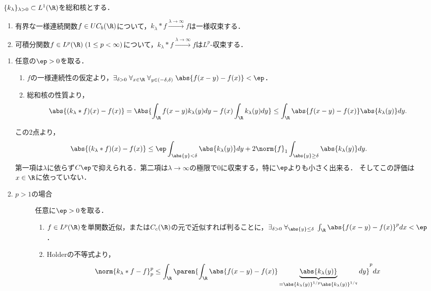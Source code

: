 \documentclass[uplatex,dvipdfmx]{jsreport}
\begin{document}
\begin{theorem}\label{thm-property-of-summerbility-kernel-in-R}
    $\{k_\lambda\}_{\lambda>0}\subset L^1(\R)$を総和核とする．
    \begin{enumerate}
        \item 有界な一様連続関数$f\in UC_b(\R)$について，$k_\lambda*f\xrightarrow{\lambda\to\infty}f$は一様収束する．
        \item 可積分関数$f\in L^p(\R)\;(1\le p<\infty)$について，$k_\lambda*f\xrightarrow{\lambda\to\infty}f$は$L^p$-収束する．
    \end{enumerate}
\end{theorem}
\begin{Proof}\mbox{}
    \begin{enumerate}
        \item 任意の$\ep>0$を取る．
        \begin{enumerate}
            \item $f$の一様連続性の仮定より，$\exists_{\delta>0}\;\forall_{x\in\R}\;\forall_{y\in(-\delta,\delta)}\;\abs{f(x-y)-f(x)}<\ep$．
            \item 総和核の性質より，
            \[\abs{(k_\lambda*f)(x)-f(x)}=\Abs{\int_\R f(x-y)k_\lambda(y)dy-f(x)\int_\R k_\lambda(y)dy}\le\int_\R\abs{f(x-y)-f(x)}\abs{k_\lambda(y)}dy.\]
        \end{enumerate}
        この2点より，
        \begin{align*}
            \abs{(k_\lambda*f)(x)-f(x)}&\le\ep\int_{\abs{y}<\delta}\abs{k_\lambda(y)}dy+2\norm{f}_1\int_{\abs{y}\ge\delta}\abs{k_\lambda(y)}dy.
        \end{align*}
        第一項は$\lambda$に依らず$C\ep$で抑えられる．第二項は$\lambda\to\infty$の極限で$0$に収束する，特に$\ep$よりも小さく出来る．
        そしてこの評価は$x\in\R$に依っていない．
        \item \begin{description}
            \item[$p>1$の場合] 任意に$\ep>0$を取る．
            \begin{enumerate}
                \item $f\in L^p(\R)$を単関数近似，または$C_c(\R)$の元で近似すれば判ることに，$\exists_{\delta>0}\;\forall_{\abs{y}\le\delta}\;\int_\R\abs{f(x-y)-f(x)}^pdx<\ep$．
                \item Holderの不等式より，
                \begin{align*}
                    \norm{k_\lambda*f-f}^p_p&\le\int_\R\paren{\int_\R\abs{f(x-y)-f(x)}\underbrace{\abs{k_\lambda(y)}}_{=\abs{k_\lambda(y)}^{1/p}\abs{k_\lambda(y)}^{1/q}}dy}^pdx\\

\end{align*}
\end{enumerate}
\end{description}
\end{enumerate}
\end{Proof}
\end{document}
